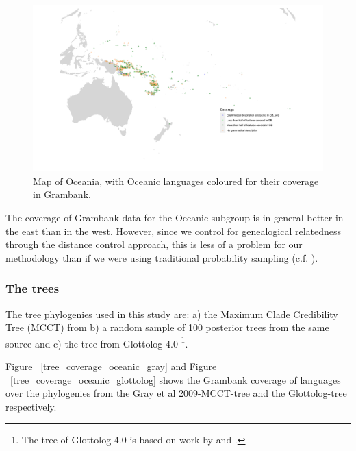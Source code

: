 \documentclass[draft,10pt]{article} %
\begin{document}
\newpage

\newpage

\begin{figure}
\centering
\includegraphics[width=\textwidth]{illustrations/plots_from_R/coverage_plots/maps/coverage_map_oceanic.png}
\caption{{Map of Oceania, with Oceanic languages coloured for their coverage in Grambank.}}
\label{GB_austro_coverage}
\end{figure} %

The coverage of Grambank data for the Oceanic subgroup is in general better in the east than in the west. However, since we control for genealogical relatedness through the distance control approach, this is less of a problem for our methodology than if we were using traditional probability sampling (c.f. \citet{ross2004morphosyntactic}).

\subsubsection{The trees}
The tree phylogenies used in this study are: a) the Maximum Clade Credibility Tree (MCCT) from \citet{grayetal_2009} b) a random sample of 100 posterior trees from the same source and c) the tree from Glottolog 4.0 \footnote{The tree of Glottolog 4.0 \citep{glottolog40} is based on work by \citet{blust_2009, blust_2014} and \citet{blust_chen_2017}.}. 

Figure ~\ref{tree_coverage_oceanic_gray} and Figure ~\ref{tree_coverage_oceanic_glottolog} shows the Grambank coverage of languages over the phylogenies from the Gray et al 2009-MCCT-tree and the Glottolog-tree respectively. 
\end{document}

